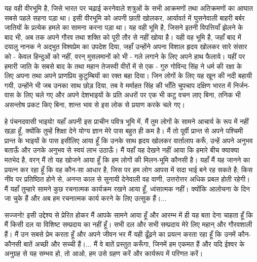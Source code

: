 
यह वही वीरभूमि है, जिसे भारत पर चढ़ाई करनेवाले शत्रुओं के सभी आक्रमणों तथा अतिक्रमणों का आघात सबसे पहले सहना पड़ा था। इसी वीरभूमि को अपनी छाती खोलकर, आर्यावर्त में घुसनेवाली बाहरी बर्बर जातियों के प्रत्येक हमले का सामना करना पड़ा था। यह वही भूमि है, जिसने इतनी विपत्तियाँ झेलने के बाद भी, अब तक अपने गौरव तथा शक्ति को पूरी तौर से नहीं खोया है। यही वह भूमि है, जहाँ बाद में दयालु नानक ने अद्भुत विश्वप्रेम का उपदेश दिया, जहाँ उन्होंने अपना विशाल हृदय खोलकर सारे संसार को - केवल हिन्दुओं को नहीं, वरन् मुसलमानों को भी - गले लगाने के लिए अपने हाथ फैलाये। यहीं पर हमारी जाति के सबसे बाद के तथा महान तेजस्वी वीरों में से एक - गुरु गोविन्द सिंह ने धर्म की रक्षा के लिए अपना तथा अपने प्राणप्रिय कुटुम्बियों का रक्त बहा दिया। जिन लोगों के लिए यह खून की नदी बहायी गयी, उन्होंने भी जब उनका साथ छोड़ दिया, तब वे मर्माहत सिंह की भाँति चुपचाप दक्षिण भारत में निर्जन-वास के लिए चले गए और अपने देशभाइयों के प्रति अधरों पर एक भी कटु वचन लाए बिना, तनिक भी असन्तोष प्रकट किए बिना, शान्त भाव से इस लोक से प्रयाण करके चले गए। 

हे पंचनदवासी भाइयो! यहाँ अपनी इस प्राचीन पवित्र भूमि में, मैं तुम लोगों के सामने आचार्य के रूप में नहीं खड़ा हूँ, क्योंकि तुम्हें शिक्षा देने योग्य ज्ञान मेरे पास बहुत ही कम है। मैं तो पूर्वी प्रान्त से अपने पश्चिमी प्रान्त के भाइयों के पास इसीलिए आया हूँ कि उनके साथ हृदय खोलकर वार्तालाप करूँ, उन्हें अपने अनुभव बताऊँ और उनके अनुभव से स्वयं लाभ उठाऊँ। मैं यहाँ यह देखने नहीं आया कि हमारे बीच क्याक्या मतभेद है, वरन् मैं तो यह खोजने आया हूँ कि हम लोगों की मिलन-भूमि कौनसी है। यहाँ मैं यह जानने का प्रयत्न कर रहा हूँ कि वह कौन-सा आधार है, जिस पर हम लोग आपस में सदा भाई बने रह सकते है; किस नींव पर प्रतिष्ठित होने से, अनन्त काल से सुनायी देनेवाली वह वाणी, उत्तरोत्तर अधिक प्रबल होती रहेगी। मैं यहाँ तुम्हारे सामने कुछ रचनात्मक कार्यक्रम रखने आया हूँ, ध्वंसात्मक नहीं। क्योंकि आलोचना के दिन जा चुके हैं और अब हम रचनात्मक कार्य करने के लिए उत्सुक हैं।... 

सज्जनो! इसी उद्देश्य से प्रेरित होकर मैं आपके सामने आया हूँ और आरम्भ में ही यह बता देना चाहता हूँ कि मैं किसी दल या विशिष्ट सम्प्रदाय का नहीं हूँ। सभी दल और सभी सम्प्रदाय मेरे लिए महान् और गौरवशाली हैं। मैं उन सबसे प्रेम करता हूँ और अपने जीवन भर मैं यही ढूँढ़ने का प्रयत्न करता रहा हूँ कि उनमें कौन-कौनसी बातें अच्छी और सच्ची हैं।... मैं वे बातें प्रस्तुत करूँगा, जिनमें हम एकमत हैं और यदि ईश्वर के अनुग्रह से यह सम्भव हो, तो आओ, हम उसे ग्रहण करें और कार्यरूप में परिणत करें। 

